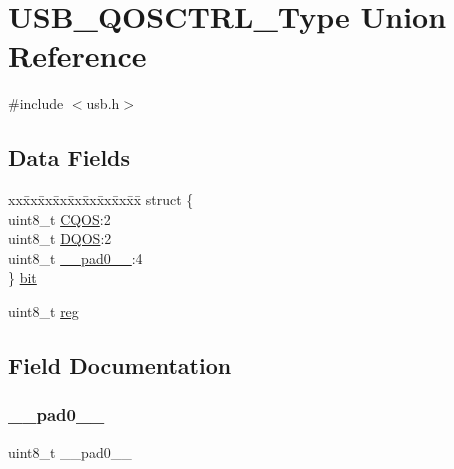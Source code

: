 \hypertarget{union_u_s_b___q_o_s_c_t_r_l___type}{}\section{U\+S\+B\+\_\+\+Q\+O\+S\+C\+T\+R\+L\+\_\+\+Type Union Reference}
\label{union_u_s_b___q_o_s_c_t_r_l___type}


{\ttfamily \#include $<$usb.\+h$>$}

\subsection*{Data Fields}
\begin{DoxyCompactItemize}
\item 
\begin{tabbing}
xx\=xx\=xx\=xx\=xx\=xx\=xx\=xx\=xx\=\kill
struct \{\\
\>uint8\_t \mbox{\hyperlink{union_u_s_b___q_o_s_c_t_r_l___type_a03cba86417c68f71d54469cf30dc94e4}{CQOS}}:2\\
\>uint8\_t \mbox{\hyperlink{union_u_s_b___q_o_s_c_t_r_l___type_adcbd494146bcd1226ac183aba7367698}{DQOS}}:2\\
\>uint8\_t \mbox{\hyperlink{union_u_s_b___q_o_s_c_t_r_l___type_a8b4eebe79ded0459acec2f4950102ba3}{\_\_pad0\_\_}}:4\\
\} \mbox{\hyperlink{union_u_s_b___q_o_s_c_t_r_l___type_a4f870df77aca85d5c6fe64a8fd95a56d}{bit}}\\

\end{tabbing}\item 
uint8\+\_\+t \mbox{\hyperlink{union_u_s_b___q_o_s_c_t_r_l___type_a9428adc9af4653a2050e2536b55dec8d}{reg}}
\end{DoxyCompactItemize}


\subsection{Field Documentation}
\mbox{\label{union_u_s_b___q_o_s_c_t_r_l___type_a8b4eebe79ded0459acec2f4950102ba3}} 
\subsubsection{\texorpdfstring{\_\_pad0\_\_}{\_\_pad0\_\_}}
{\footnotesize\ttfamily uint8\+\_\+t \+\_\+\+\_\+pad0\+\_\+\+\_\+}

